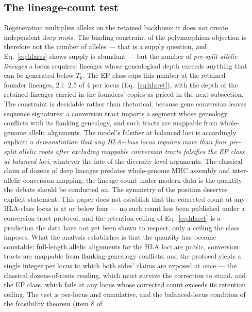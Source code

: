 \subsection{The lineage-count test}\label{sec:roots}
Regeneration multiplies alleles on the retained backbone; it does not
create independent deep roots. The binding constraint of the polymorphism
objection is therefore not the number of alleles --- that is a supply
question, and Eq.~\eqref{eq:hlares} shows supply is abundant --- but the
number of \emph{pre-split allelic lineages} a locus requires: lineages
whose genealogical depth exceeds anything that can be generated below
$T_0$. The EP class caps this number at the retained founder lineages,
$2.1$--$2.5$ of $4$ per locus (Eq.~\eqref{eq:hlaret}), with the depth of
the retained lineages carried in the founders' copies as priced in the
next subsection. The constraint is decidable rather than rhetorical,
because gene conversion leaves sequence signatures: a conversion tract
imports a segment whose genealogy conflicts with its flanking genealogy,
and such tracts are mappable from whole-genome allelic alignments. The
model's falsifier at balanced loci is accordingly explicit: \emph{a
demonstration that any HLA-class locus requires more than four pre-split
allelic roots after excluding mappable conversion tracts falsifies the EP
class at balanced loci}, whatever the fate of the diversity-level
arguments. The classical claim of dozens of deep lineages
\citep{Ayala1995} predates whole-genome MHC assembly and inter-allelic
conversion mapping; the lineage count under modern data is the quantity
the debate should be conducted on. The symmetry of the position deserves
explicit statement. This paper does not establish that the corrected count
at any HLA-class locus is at or below four --- no such count has been
published under a conversion-tract protocol, and the retention ceiling of
Eq.~\eqref{eq:hlaret} is a prediction the data have not yet been shown to
respect, only a ceiling the class imposes. What the analysis establishes
is that the quantity has become countable: full-length allelic alignments
for the HLA loci are public, conversion tracts are mappable from
flanking-genealogy conflicts, and the protocol yields a single integer per
locus to which both sides' claims are exposed at once --- the classical
dozens-of-roots reading, which must survive the correction to stand, and
the EP class, which fails at any locus whose corrected count exceeds its
retention ceiling. The test is per-locus and cumulative, and the
balanced-locus condition of the feasibility theorem (item 8 of
